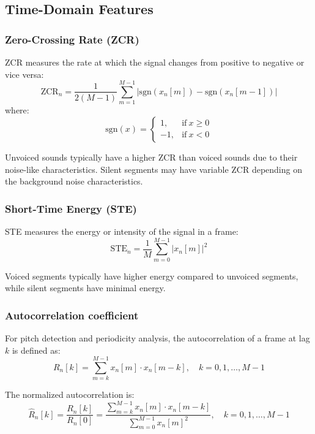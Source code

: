 \documentclass[10pt,journal,compsoc]{IEEEtran}
\begin{document}
\subsection{Time-Domain Features}

\subsubsection{Zero-Crossing Rate (ZCR)}
ZCR measures the rate at which the signal changes from positive to negative or vice versa:
\begin{equation}
\text{ZCR}_n = \frac{1}{2(M-1)} \sum_{m=1}^{M-1} |\text{sgn}(x_n[m]) - \text{sgn}(x_n[m-1])|
\end{equation}
where:
\begin{equation}
\text{sgn}(x) = 
\begin{cases} 
1, & \text{if}\ x \geq 0 \\ 
-1, & \text{if}\ x < 0 
\end{cases}
\end{equation}

Unvoiced sounds typically have a higher ZCR than voiced sounds due to their noise-like characteristics. Silent segments may have variable ZCR depending on the background noise characteristics.

\subsubsection{Short-Time Energy (STE)}
STE measures the energy or intensity of the signal in a frame:
\begin{equation}
\text{STE}_n = \frac{1}{M} \sum_{m=0}^{M-1} |x_n[m]|^2
\end{equation}

Voiced segments typically have higher energy compared to unvoiced segments, while silent segments have minimal energy.

\subsubsection{Autocorrelation coefficient}
For pitch detection and periodicity analysis, the autocorrelation of a frame at lag $k$ is defined as:
\begin{equation}
R_n[k] = \sum_{m=k}^{M-1} x_n[m] \cdot x_n[m-k], \quad k = 0, 1, \dots, M-1
\end{equation}

The normalized autocorrelation is:
\begin{equation}
\hat{R}_n[k] = \frac{R_n[k]}{R_n[0]} = \frac{\sum_{m=k}^{M-1} x_n[m] \cdot x_n[m-k]}{\sum_{m=0}^{M-1} x_n[m]^2}, \quad k = 0, 1, \dots, M-1
\end{equation}
\end{document}
